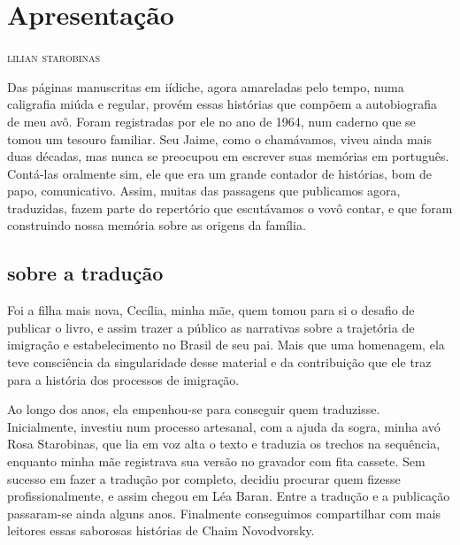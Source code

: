 \newcommand{\subtitulo}[1]{\NoCaseChange{\textnormal{\break\Large\itshape#1}}}
\chapter*{Apresentação\smallskip\subtitulo{Um \emph{road movie} em forma\\de narrativa}}


\begin{flushright}
\textsc{lilian starobinas}
\end{flushright}\medskip

\noindent{}Das páginas manuscritas em iídiche, agora amareladas pelo tempo, numa
caligrafia miúda e regular, provém essas histórias que compõem a
autobiografia de meu avô. Foram registradas por ele no ano de 1964, num
caderno que se tomou um tesouro familiar. Seu Jaime, como o chamávamos,
viveu ainda mais duas décadas, mas nunca se preocupou em escrever suas
memórias em português. Contá-las oralmente sim, ele que era um grande
contador de histórias, bom de papo, comunicativo. Assim, muitas das
passagens que publicamos agora, traduzidas, fazem parte do repertório que
escutávamos o vovô contar, e que foram construindo nossa memória sobre
as origens da família.

\section{sobre a tradução}

Foi a filha mais nova, Cecília, minha mãe, quem tomou para si o desafio
de publicar o livro, e assim trazer a público as narrativas sobre a
trajetória de imigração e estabelecimento no Brasil de seu pai. Mais que
uma homenagem, ela teve consciência da singularidade desse material e da
contribuição que ele traz para a história dos processos de imigração.

Ao longo dos anos, ela empenhou-se para conseguir quem traduzisse.
Inicialmente, investiu num processo artesanal, com a ajuda da sogra,
minha avó Rosa Starobinas, que lia em voz alta o texto e traduzia os
trechos na sequência, enquanto minha mãe registrava sua versão no
gravador com fita cassete. Sem sucesso em fazer a tradução por completo,
decidiu procurar quem fizesse profissionalmente, e assim chegou em Léa
Baran. Entre a tradução e a publicação passaram-se ainda alguns anos.
Finalmente conseguimos compartilhar com mais leitores essas saborosas
histórias de Chaim Novodvorsky.

